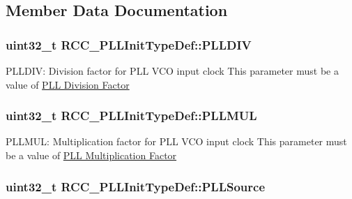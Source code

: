 \subsection{Member Data Documentation}
\hypertarget{struct_r_c_c___p_l_l_init_type_def_a7b0ad197ffcf75b68f7fa90ce1c99103}{
\subsubsection[{P\-L\-L\-D\-I\-V}]{\setlength{\rightskip}{0pt plus 5cm}uint32\-\_\-t R\-C\-C\-\_\-\-P\-L\-L\-Init\-Type\-Def\-::\-P\-L\-L\-D\-I\-V}}\label{struct_r_c_c___p_l_l_init_type_def_a7b0ad197ffcf75b68f7fa90ce1c99103}
P\-L\-L\-D\-I\-V\-: Division factor for P\-L\-L V\-C\-O input clock This parameter must be a value of \hyperlink{group___r_c_c___p_l_l___division___factor}{P\-L\-L Division Factor} \hypertarget{struct_r_c_c___p_l_l_init_type_def_a351617c365fad2d58aedb7335308044b}{
\subsubsection[{P\-L\-L\-M\-U\-L}]{\setlength{\rightskip}{0pt plus 5cm}uint32\-\_\-t R\-C\-C\-\_\-\-P\-L\-L\-Init\-Type\-Def\-::\-P\-L\-L\-M\-U\-L}}\label{struct_r_c_c___p_l_l_init_type_def_a351617c365fad2d58aedb7335308044b}
P\-L\-L\-M\-U\-L\-: Multiplication factor for P\-L\-L V\-C\-O input clock This parameter must be a value of \hyperlink{group___r_c_c___p_l_l___multiplication___factor}{P\-L\-L Multiplication Factor} \hypertarget{struct_r_c_c___p_l_l_init_type_def_a72806832a179af8756b9330de7f7c6a8}{
\subsubsection[{P\-L\-L\-Source}]{\setlength{\rightskip}{0pt plus 5cm}uint32\-\_\-t R\-C\-C\-\_\-\-P\-L\-L\-Init\-Type\-Def\-::\-P\-L\-L\-Source}}\label{struct_r_c_c___p_l_l_init_type_def_a72806832a179af8756b9330de7f7c6a8}
